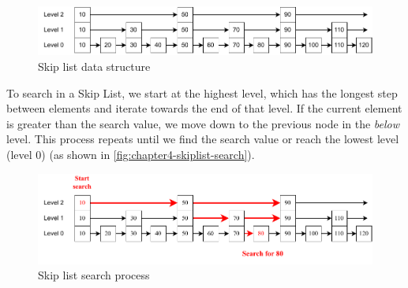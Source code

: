\begin{figure}[th!]
    \centering
    \includegraphics[width=\linewidth]{content/resources/images/fashion-recommendation/chapter4-skiplist.pdf}
    \caption{Skip list data structure}
    \label{fig:chapter4-skiplist}
\end{figure}

To search in a Skip List, we start at the highest level, which has the longest step between elements and iterate towards the end of that level. If the current element is greater than the search value, we move down to the previous node in the \textit{below} level. This process repeats until we find the search value or reach the lowest level (level 0) (as shown in \autoref{fig:chapter4-skiplist-search}).

\begin{figure}[th!]
    \centering
    \includegraphics[width=\linewidth]{content/resources/images/fashion-recommendation/chapter4-skiplist-search.pdf}
    \caption{Skip list search process}
    \label{fig:chapter4-skiplist-search}
\end{figure}

